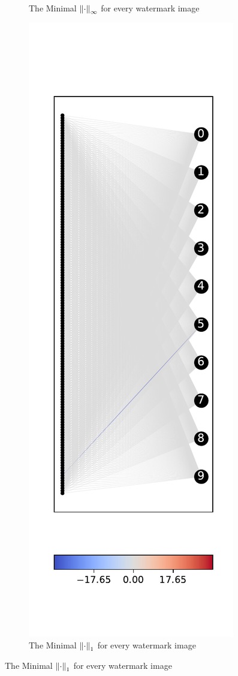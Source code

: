 \documentclass[a4paper]{llncs}
\begin{document}
\begin{figure}[h!]
\begin{subfigure}{0.4\linewidth}
     \caption{The Minimal $\left\lVert\cdot\right\rVert_{\infty}$ for every watermark image}
  \end{subfigure}
  \begin{subfigure}{0.4\linewidth}
    \includegraphics[width=\linewidth]{../data/results/problem2/last_layer_1_wm_example.pdf}
    \caption{The Minimal $\left\lVert\cdot\right\rVert_1$ for every watermark image}
  \end{subfigure}
  \label{fig:lastLayerExample1}
\end{figure}
\end{document}
